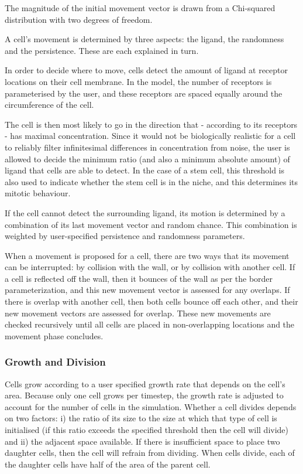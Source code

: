 \documentclass[12pt]{article}
\begin{document}
The magnitude of the initial movement vector is drawn from a Chi-squared 
distribution with two degrees of freedom. 

A cell's movement is determined by three aspects: the ligand, the 
randomness and the persistence. These are each explained in turn.

In order to decide where to move, cells detect the amount of ligand at 
receptor locations on their cell membrane. In the model, the number of 
receptors is parameterised by the user, and these receptors are spaced 
equally around the circumference of the cell. 

The cell is then most likely to go in the direction that - according to 
its receptors - has maximal concentration. Since it would not be 
biologically realistic for a cell to reliably filter infinitesimal 
differences in concentration from noise, the user is allowed to 
decide the minimum ratio (and also a minimum absolute amount) of ligand 
that cells are able to detect. In the case of a stem cell, this 
threshold is also used to indicate whether the stem cell is in the 
niche, and this determines its mitotic behaviour.

If the cell cannot detect the surrounding ligand, its motion is 
determined by a combination of its last movement vector and random 
chance. This combination is weighted by user-specified persistence and 
randomness parameters.

When a movement is proposed for a cell, there are two ways that its 
movement can be interrupted: by collision with the wall, or by collision 
with another cell. If a cell is reflected off the wall, then it bounces 
of the wall as per the border parameterization, and this new movement 
vector is assessed for any overlaps. If there is overlap with another 
cell, then both cells bounce off each other, and their new movement 
vectors are assessed for overlap. These new movements are checked 
recursively until all cells are placed in non-overlapping locations and 
the movement phase concludes.

\subsubsection{Growth and Division}
Cells grow according to a user specified growth rate that depends on the 
cell's area. Because only one cell grows per timestep, the growth rate 
is adjusted to account for the number of cells in the simulation. 
Whether a cell divides depends on two factors: i) the ratio of its size 
to the size at which that type of cell is initialised (if this ratio 
exceeds the specified threshold then the cell will divide) and ii) the 
adjacent space available. If there is insufficient space to place two 
daughter cells, then the cell will refrain from dividing. When cells 
divide, each of the daughter cells have half of the area of the parent 
cell. 
\end{document}
